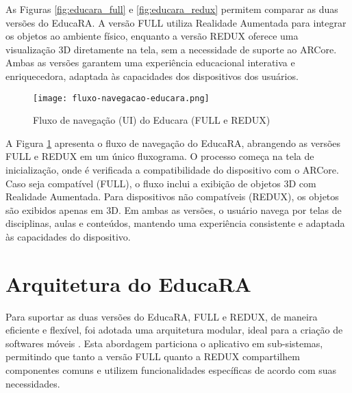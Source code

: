 \documentclass[12pt]{article}
\begin{document}

As Figuras \ref{fig:educara_full} e \ref{fig:educara_redux} permitem comparar as duas versões do EducaRA. A versão FULL utiliza Realidade Aumentada para integrar os objetos ao ambiente físico, enquanto a versão REDUX oferece uma visualização 3D diretamente na tela, sem a necessidade de suporte ao ARCore. Ambas as versões garantem uma experiência educacional interativa e enriquecedora, adaptada às capacidades dos dispositivos dos usuários.

\begin{figure}[H]
  \centering
  \texttt{[image: fluxo-navegacao-educara.png]}
  \caption{Fluxo de navegação (UI) do Educara (FULL e REDUX)}
  \label{fig:fluxo-ui-educara}
\end{figure}

A Figura \ref{fig:fluxo-ui-educara} apresenta o fluxo de navegação do EducaRA, abrangendo as versões FULL e REDUX em um único fluxograma. O processo começa na tela de inicialização, onde é verificada a compatibilidade do dispositivo com o ARCore. Caso seja compatível (FULL), o fluxo inclui a exibição de objetos 3D com Realidade Aumentada. Para dispositivos não compatíveis (REDUX), os objetos são exibidos apenas em 3D. Em ambas as versões, o usuário navega por telas de disciplinas, aulas e conteúdos, mantendo uma experiência consistente e adaptada às capacidades do dispositivo.

\section{Arquitetura do EducaRA}\label{sec:arquitetura}

Para suportar as duas versões do EducaRA, FULL e REDUX, de maneira eficiente e flexível, foi adotada uma arquitetura modular, ideal para a criação de softwares móveis \cite{gomes2023modularizaccao}. Esta abordagem particiona o aplicativo em sub-sistemas, permitindo que tanto a versão FULL quanto a REDUX compartilhem componentes comuns e utilizem funcionalidades específicas de acordo com suas necessidades.
\end{document}
